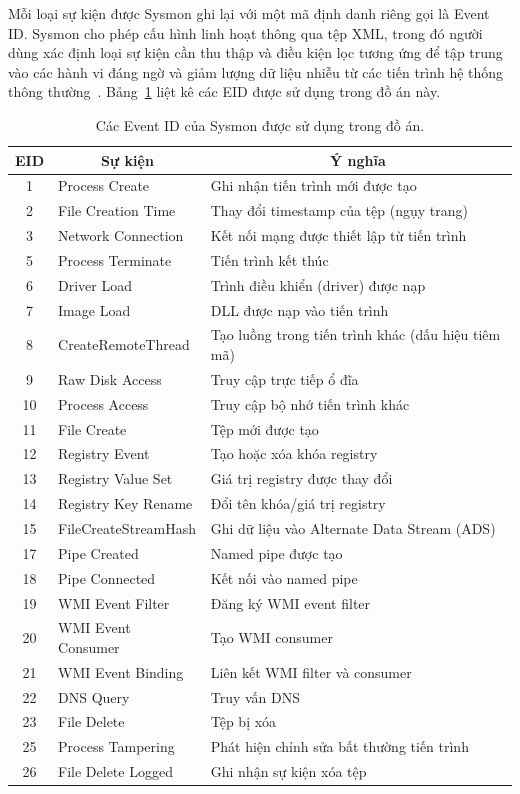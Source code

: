 \documentclass[../DoAn.tex]{subfiles}
\begin{document}
Mỗi loại sự kiện được Sysmon ghi lại với một mã định danh riêng gọi là
Event ID. Sysmon cho phép cấu hình linh hoạt thông qua tệp XML, trong
đó người dùng xác định loại sự kiện cần thu thập và điều kiện lọc tương
ứng để tập trung vào các hành vi đáng ngờ và giảm lượng dữ liệu nhiễu
từ các tiến trình hệ thống thông thường~\cite{sysmon}. Bảng~\ref{tab:sysmon_eid}
liệt kê các EID được sử dụng trong đồ án này.
\begin{table}[H]
\centering
\caption{Các Event ID của Sysmon được sử dụng trong đồ án.}
\label{tab:sysmon_eid}
\begin{tabular}{|c|l|p{9cm}|}
\hline
\multicolumn{1}{|c|}{\textbf{EID}} & \multicolumn{1}{c|}{\textbf{Sự kiện}} & \multicolumn{1}{c|}{\textbf{Ý nghĩa}} \\
\hline
1  & Process Create        & Ghi nhận tiến trình mới được tạo \\
\hline
2  & File Creation Time    & Thay đổi timestamp của tệp (ngụy trang) \\
\hline
3  & Network Connection    & Kết nối mạng được thiết lập từ tiến trình \\
\hline
5  & Process Terminate     & Tiến trình kết thúc \\
\hline
6  & Driver Load           & Trình điều khiển (driver) được nạp \\
\hline
7  & Image Load            & DLL được nạp vào tiến trình \\
\hline
8  & CreateRemoteThread    & Tạo luồng trong tiến trình khác (dấu hiệu tiêm mã) \\
\hline
9  & Raw Disk Access       & Truy cập trực tiếp ổ đĩa \\
\hline
10 & Process Access        & Truy cập bộ nhớ tiến trình khác \\
\hline
11 & File Create           & Tệp mới được tạo \\
\hline
12 & Registry Event        & Tạo hoặc xóa khóa registry \\
\hline
13 & Registry Value Set    & Giá trị registry được thay đổi \\
\hline
14 & Registry Key Rename    & Đổi tên khóa/giá trị registry \\
\hline
15 & FileCreateStreamHash   & Ghi dữ liệu vào Alternate Data Stream (ADS) \\
\hline
17 & Pipe Created          & Named pipe được tạo \\
\hline
18 & Pipe Connected        & Kết nối vào named pipe \\
\hline
19 & WMI Event Filter      & Đăng ký WMI event filter \\
\hline
20 & WMI Event Consumer    & Tạo WMI consumer \\
\hline
21 & WMI Event Binding     & Liên kết WMI filter và consumer \\
\hline
22 & DNS Query             & Truy vấn DNS \\
\hline
23 & File Delete           & Tệp bị xóa \\
\hline
25 & Process Tampering     & Phát hiện chỉnh sửa bất thường tiến trình \\
\hline
26 & File Delete Logged    & Ghi nhận sự kiện xóa tệp \\
\hline
\end{tabular}
\end{table}
\end{document}
